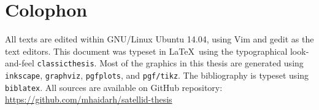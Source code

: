 \pagestyle{empty}

\hfill

\vfill

\section*{Colophon}
All texts are edited within GNU/Linux Ubuntu 14.04, using Vim and gedit as the text editors.
This document was typeset in \LaTeX~using the typographical look-and-feel \texttt{classicthesis}.
Most of the graphics in this thesis are generated using \texttt{inkscape}, \texttt{graphviz}, \texttt{pgfplots}, and \texttt{pgf/tikz}.
The bibliography is typeset using \texttt{biblatex}.
All sources are available on GitHub repository: \url{https://github.com/mhaidarh/satellid-thesis}

